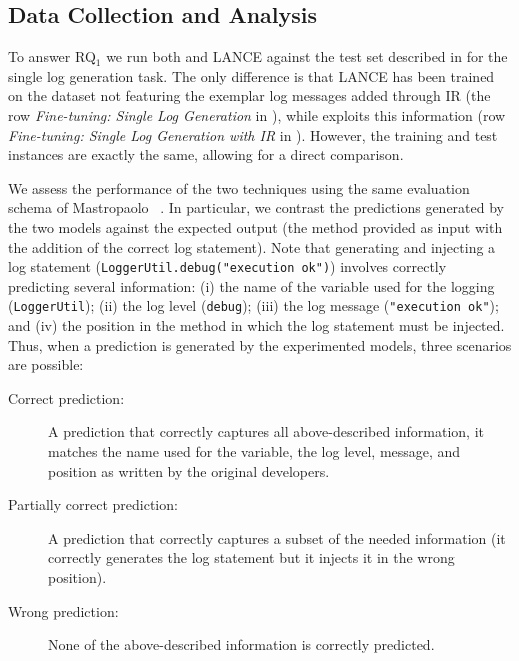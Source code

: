 \subsection{Data Collection and Analysis}

To answer RQ$_1$ we run both \approach and LANCE against the test set described in  for the single log generation task. The only difference is that LANCE has been trained on the dataset not featuring the exemplar log messages added through IR (\ie the row \emph{Fine-tuning: Single Log Generation} in ), while \approach exploits this information (row \emph{Fine-tuning: Single Log Generation with IR} in ). However, the training and test instances are exactly the same, allowing for a direct comparison.

We assess the performance of the two techniques using the same evaluation schema of Mastropaolo \etal~\cite{mastropaolo2022using}. In particular, we contrast the predictions generated by the two models against the expected output (\ie the \java method provided as input with the addition of the correct log statement). Note that generating and injecting a log statement  (\eg \texttt{LoggerUtil.debug("execution ok")}) involves correctly predicting several information: (i) the name of the variable used for the logging (\ie \texttt{LoggerUtil}); (ii) the log level (\ie \texttt{debug}); (iii) the log message (\ie \texttt{"execution ok"}); and (iv) the position in the method in which the log statement must be injected. Thus, when a prediction is generated by the experimented models, three scenarios are possible:

\begin{description}
	\item[Correct prediction:] A prediction that correctly captures all above-described information, \ie it matches the name used for the variable, the log level, message, and position as written by the original developers.

	\item[Partially correct prediction:] A prediction that correctly captures a subset of the needed information (\eg it correctly generates the log statement but it injects it in the wrong position).

	\item[Wrong prediction:] None of the above-described information is correctly predicted.
\end{description}


